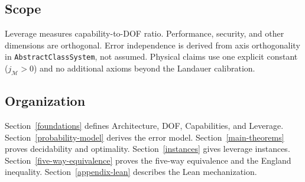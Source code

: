 \subsection{Scope}

Leverage measures capability-to-DOF ratio. Performance, security, and other dimensions are orthogonal. Error independence is derived from axis orthogonality in \texttt{AbstractClassSystem}, not assumed. Physical claims use one explicit constant ($j_\mathcal{M} > 0$) and no additional axioms beyond the Landauer calibration.

\subsection{Organization}

Section~\ref{foundations} defines Architecture, DOF, Capabilities, and Leverage. Section~\ref{probability-model} derives the error model. Section~\ref{main-theorems} proves decidability and optimality. Section~\ref{instances} gives leverage instances. Section~\ref{five-way-equivalence} proves the five-way equivalence and the England inequality. Section~\ref{appendix-lean} describes the Lean mechanization.
